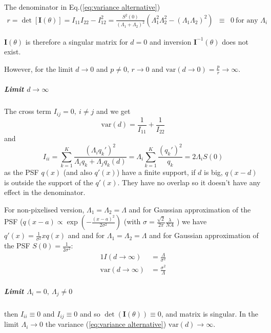 The denominator in Eq.(\ref{eq:variance alternative}) 
%
\begin{eqnarray*}
	r=\det\left[\bm{I}(\theta)\right]=I_{11}I_{22}-I_{12}^{2}=\frac{S^{2}(0)}{\left(\Lambda_{1}+\Lambda_{2}\right)^{2}}\left(\Lambda_{1}^{2}\Lambda_{2}^{2}-(\Lambda_{1}\Lambda_{2})^{2}\right) & \equiv & 0\ \text{for any }\Lambda_{i}
\end{eqnarray*}

$\bm{I}(\theta)$ is therefore a singular matrix for $d=0$ and inversion $\bm{I}^{-1}(\theta)$ does not exist. 

However, for the limit $d\rightarrow0$ and $p\neq0,\, r\rightarrow0$
and $\textrm{var}(d\rightarrow0)=\frac{p}{r}\rightarrow\infty$. 

\subparagraph*{Limit $d\rightarrow\infty$}

The cross term $I_{ij}=0,\: i\neq j$ and we get
%
\begin{equation}
	\textrm{var}(d)=\frac{1}{I_{11}}+\frac{1}{I_{22}}
\end{equation}
%
and 
%
\begin{equation}
	I_{ii}=\sum_{k=1}^{K}\frac{\left(\Lambda_{i}q_{k}'\right)^{2}}{\Lambda_{i}q_{k}+\Lambda_{j}q_{k}(d)}=\Lambda_{i}\sum_{k=1}^{K}\frac{\left(q_{k}'\right)^{2}}{q_{k}}=2\Lambda_{i}S(0)
\end{equation}
%
as the PSF $q(x)$ (and also $q'(x)$) have a finite support, if $d$ is big, $q(x-d)$ is outside the support of the $q'(x)$. They have no overlap so it doesn't have any effect in the denominator. 

For non-pixelised version, $\Lambda_{1}=\Lambda_{2}=\Lambda$ and for Gaussian approximation of the PSF ($q(x-a)\propto\exp\left(-\frac{(x-a)^{2}}{2\sigma^{2}}\right)$ (with $\sigma=\frac{\sqrt{2}}{2\pi}\frac{\lambda}{NA}$ \citep{Zhang2007}) we have $q'(x)=\frac{1}{\sigma^{2}}xq(x)$ and and for $\Lambda_{1}=\Lambda_{2}=\Lambda$ and for Gaussian approximation of the PSF $S(0)=\frac{1}{2\sigma^{2}}$:
%
\begin{alignat*}{1}
	I(d\rightarrow\infty) & =\frac{\Lambda}{\sigma^{2}}\\
	\textrm{var}(d\rightarrow\infty) & =\frac{\sigma^{2}}{\Lambda}
\end{alignat*}

\subparagraph{Limit $\Lambda_{i}=0,\ \Lambda_{j}\neq0$}

then $I_{ii}\equiv0$ and $I_{ij}\equiv0$ and so $\det(\bm{I}(\theta))\equiv0$, and matrix is singular. In the limit $\Lambda_{i}\rightarrow0$ the variance (\ref{eq:variance alternative}) $\textrm{var}(d)\rightarrow\infty$. 

